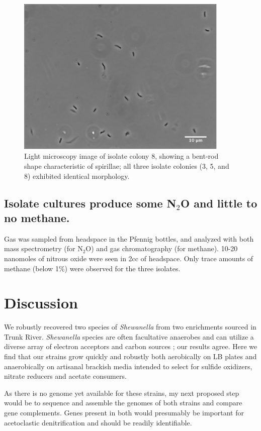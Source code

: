 \documentclass{article}
\begin{document}
\begin{figure}[!ht]
  \centerline{\includegraphics[width=4in]{spirilla.png}}
  \caption{Light microscopy image of isolate colony 8, showing a
    bent-rod shape characteristic of spirillae; all three isolate
    colonies (3, 5, and 8) exhibited identical morphology.}
  \label{fig:spirilla}
\end{figure}

\subsection*{Isolate cultures produce some N$_2$O and little to no methane.}

Gas was sampled from headspace in the Pfennig bottles, and analyzed
with both mass spectrometry (for N$_2$O) and gas chromatography (for
methane).  10-20 nanomoles of nitrous oxide were seen in 2cc of
headspace.  Only trace amounts of methane (below 1\%) were observed
for the three isolates.

\section*{Discussion}

We robustly recovered two species of {\em Shewanella} from two
enrichments sourced in Trunk River.  {\em Shewanella} species are
often facultative anaerobes and can utilize a diverse array of
electron acceptors and carbon sources
\cite{venkateswaran1999polyphasic}; our results agree.  Here we find
that our strains grow quickly and robustly both aerobically on LB
plates and anaerobically on artisanal brackish media intended to
select for sulfide oxidizers, nitrate reducers and acetate consumers.

As there is no genome yet available for these strains, my next
proposed step would be to sequence and assemble the genomes of both
strains and compare gene complements.  Genes present in both would
presumably be important for acetoclastic denitrification and should
be readily identifiable.
\end{document}
